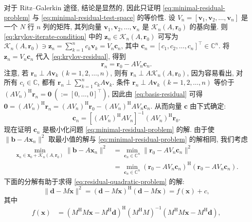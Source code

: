 \begin{Proof}
对于 Ritz--Galerkin 途径, 结论是显然的, 因此只证明 \eqref{eq:minimal-residual-problem} 与 \eqref{eq:minimal-residual-test-space} 的等价性. 设 $V_n=[\bm v_1,\bm v_2,\ldots,\bm v_n]$ 是一个 $N$ 行 $n$ 列的矩阵, 其列向量 $\bm v_1,\bm v_2,\ldots,\bm v_n$ 是 $\mathcal K_n(A,\bm r_0)$ 的基向量. 则 \eqref{eq:krylov-iterate-condition} 中的 $\bm z_n\in\mathcal K_n(A,\bm r_0)$ 可写为 $\mathcal K_n(A,\bm r_0)\ni\bm z_n=\sum_{k=1}^n c_k\bm v_k=V_n\bm c_n$, 其中 $\bm c_n=[c_1,c_2,\ldots,c_n]^\top\in\mathbb C^n$. 将 $\bm z_n=V_n\bm c_n$ 代入 \eqref{eq:krylov-residual}, 得到
\begin{equation}\label{eq:basis-residual}
\bm r_n=\bm r_0-AV_n\bm c_n.
\end{equation}
注意, 若 $\bm r_n\perp A\bm v_k\ (k=1,2,\ldots,n)$, 则有 $\bm r_n\perp A\mathcal K_n(A,\bm r_0)$, 因为容易看出, 对所有 $c_i\in\mathbb C$, 都有 $\bm r_n\perp\sum_{k=1}^n c_kA\bm v_k$. 条件 $\bm r_n\perp A\bm v_k\ (k=1,2,\ldots,n)$ 等价于 $(AV_n)^{\mathrm H}\bm r_n=\bm 0\ (:= [0,\ldots,0]^\top)$, 因此由 \eqref{eq:basis-residual} 可得 $\bm 0=(AV_n)^{\mathrm H}\bm r_n=(AV_n)^{\mathrm H}\bm r_0-(AV_n)^{\mathrm H}AV_n\bm c_n$. 从而向量 $\bm c$ 由下式确定:
\begin{equation}\label{eq:normal-equation-coefficients}
\bm c_n=[(AV_n)^{\mathrm H}AV_n]^{-1}(AV_n)^{\mathrm H}\bm r_0.
\end{equation}
现在证明 $\bm c_n$ 是极小化问题 \eqref{eq:minimal-residual-problem} 的解. 由于使 $\|\bm b-A\bm x_n\|^2$ 取最小值的解与 \eqref{eq:minimal-residual-problem} 的解相同, 我们考虑
\begin{equation}\label{eq:residual-quadratic-problem}
\begin{aligned}
\min_{\bm x_n\in\bm x_0+\mathcal K_n(A,\bm r_0)}\|\bm b-A\bm x_n\|^2
&=\min_{\bm c_n\in\mathbb C^n}\|\bm r_0-AV_n\bm c_n\|^2\\
&=\min_{\bm c_n\in\mathbb C^n}(\bm r_0-AV_n\bm c_n)^{\mathrm H}(\bm r_0-AV_n\bm c_n).
\end{aligned}
\end{equation}
下面的分解有助于求得 \eqref{eq:residual-quadratic-problem} 的解:
\begin{equation}\label{eq:least-squares-decomposition}
\|\bm d-M\bm x\|^2=(\bm d-M\bm x)^{\mathrm H}(\bm d-M\bm x)=f(\bm x)+c,
\end{equation}
其中
\[
\begin{aligned}
f(\bm x)&=(M^{\mathrm H}M\bm x-M^{\mathrm H}\bm d)^{\mathrm H}(M^{\mathrm H}M)^{-1}(M^{\mathrm H}M\bm x-M^{\mathrm H}\bm d),\\

\end{aligned}\]
\end{Proof}
